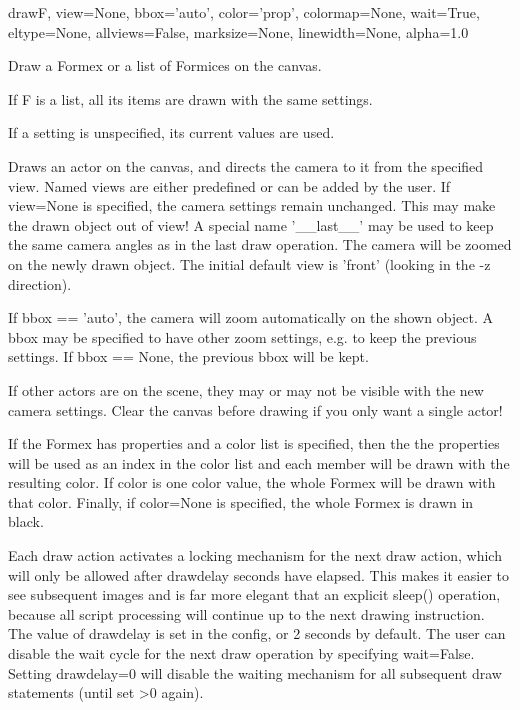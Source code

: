 \begin{funcdesc}{draw}{F, view=None, bbox='auto', color='prop', colormap=None, wait=True, eltype=None, allviews=False, marksize=None, linewidth=None, alpha=1.0}

Draw a Formex or a list of Formices on the canvas.

    If F is a list, all its items are drawn with the same settings.

    If a setting is unspecified, its current values are used.
    
    Draws an actor on the canvas, and directs the camera to it from
    the specified view. Named views are either predefined or can be added by
    the user.
    If view=None is specified, the camera settings remain unchanged.
    This may make the drawn object out of view!
    A special name '__last__' may be used to keep the same camera angles
    as in the last draw operation. The camera will be zoomed on the newly
    drawn object.
    The initial default view is 'front' (looking in the -z direction).

    If bbox == 'auto', the camera will zoom automatically on the shown
    object. A bbox may be specified to have other zoom settings, e.g. to
    keep the previous settings. If bbox == None, the previous bbox will be
    kept.

    If other actors are on the scene, they may or may not be visible with the
    new camera settings. Clear the canvas before drawing if you only want
    a single actor!

    If the Formex has properties and a color list is specified, then the
    the properties will be used as an index in the color list and each member
    will be drawn with the resulting color.
    If color is one color value, the whole Formex will be drawn with
    that color.
    Finally, if color=None is specified, the whole Formex is drawn in black.
    
    Each draw action activates a locking mechanism for the next draw action,
    which will only be allowed after drawdelay seconds have elapsed. This
    makes it easier to see subsequent images and is far more elegant that an
    explicit sleep() operation, because all script processing will continue
    up to the next drawing instruction.
    The value of drawdelay is set in the config, or 2 seconds by default.
    The user can disable the wait cycle for the next draw operation by
    specifying wait=False. Setting drawdelay=0 will disable the waiting
    mechanism for all subsequent draw statements (until set >0 again).

\end{funcdesc}

